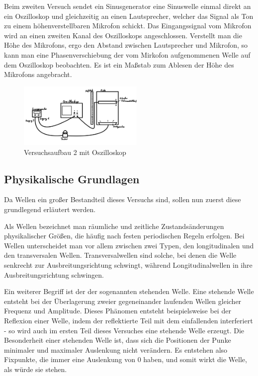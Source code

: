 \documentclass{article}
\begin{document}
\newpage 

Beim zweiten Versuch sendet ein Sinusgenerator eine Sinuswelle einmal direkt an ein Oszilloskop und gleichzeitig an einen Lautsprecher, welcher das Signal als Ton zu einem höhenverstellbaren Mikrofon schickt. Das Eingangssignal vom Mikrofon wird an einen zweiten Kanal des Oszilloskops angeschlossen. Verstellt man die Höhe des Mikrofons, ergo den Abstand zwischen Lautsprecher und Mikrofon, so kann man eine Phasenverschiebung der vom Mirkofon aufgenommenen Welle auf dem Oszilloskop beobachten. Es ist ein Maßstab zum Ablesen der Höhe des Mikrofons angebracht.

\begin{figure}[h] 
\centering
\caption{Versuchsaufbau 2 mit Oszilloskop} \label{gr:N2}
\includegraphics[width=6cm]{graphics/Skizze2.png}
\end{figure}

\newpage

\subsection{Physikalische Grundlagen}

Da Wellen ein großer Bestandteil dieses Versuchs sind, sollen nun zuerst diese grundlegend erläutert werden.

Als Wellen bezeichnet man räumliche und zeitliche Zustandsänderungen physikalischer Größen, die häufig nach festen periodischen Regeln erfolgen. Bei Wellen unterscheidet man vor allem zwischen zwei Typen, den longitudinalen und den transversalen Wellen. Transversalwellen sind solche, bei denen die Welle senkrecht zur Ausbreitungsrichtung schwingt, während Longitudinalwellen in ihre Ausbreitungsrichtung schwingen.

Ein weiterer Begriff ist der der sogenannten stehenden Welle. Eine stehende Welle entsteht bei der Überlagerung zweier gegeneinander laufenden Wellen gleicher Frequenz und Amplitude. Dieses Phänomen entsteht beispielsweise bei der Reflexion einer Welle, indem der reflektierte Teil mit dem einfallenden interferiert - so wird auch im ersten Teil dieses Versuches eine stehende Welle erzeugt. Die Besonderheit einer stehenden Welle ist, dass sich die Positionen der Punke minimaler und maximaler Auslenkung nicht verändern. Es entstehen also Fixpunkte, die immer eine Auslenkung von 0 haben, und somit wirkt die Welle, als würde sie stehen. 
\end{document}
